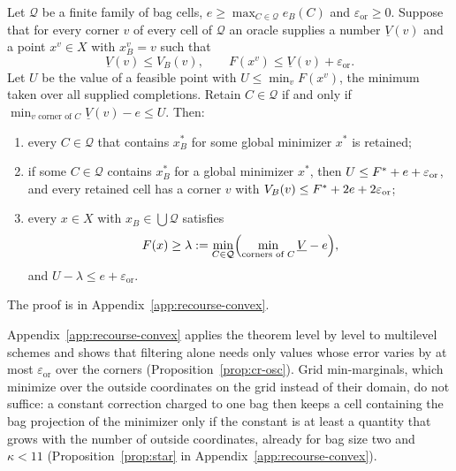 \begin{theorem}\label{thm:cr-filter}
Let $\mathcal Q$ be a finite family of bag cells,
$e\ge\max_{C\in\mathcal Q}e_B(C)$ and $\varepsilon_{\mathrm{or}}\ge0$. Suppose that for every
corner $v$ of every cell of $\mathcal Q$ an oracle supplies a number
$\underline V(v)$ and a point $x^v\in X$ with $x^v_B=v$ such that
\begin{equation}\label{eq:cr-oracle}
\underline V(v)\le V_B(v),\qquad F(x^v)\le\underline V(v)+\varepsilon_{\mathrm{or}} .
\end{equation}
Let $U$ be the value of a feasible point with $U\le\min_vF(x^v)$, the
minimum taken over all supplied completions. Retain $C\in\mathcal Q$ if and
only if $\min_{v\text{ corner of }C}\underline V(v)-e\le U$. Then:
\begin{enumerate}
\item[(a)] every $C\in\mathcal Q$ that contains $x^*_B$ for some global
minimizer $x^*$ is retained;
\item[(b)] if some $C\in\mathcal Q$ contains $x^*_B$ for a global minimizer
$x^*$, then $U\le F^{*}+e+\varepsilon_{\mathrm{or}}$, and every retained cell has a corner $v$
with $V_B(v)\le F^{*}+2e+2\varepsilon_{\mathrm{or}}$;
\item[(c)] every $x\in X$ with $x_B\in\bigcup\mathcal Q$ satisfies
\[
F(x)\ge\lambda:=\min_{C\in\mathcal Q}\Bigl(\min_{\text{corners of }C}\underline V-e\Bigr),
\]
and $U-\lambda\le e+\varepsilon_{\mathrm{or}}$.
\end{enumerate}
\end{theorem}

The proof is in Appendix~\ref{app:recourse-convex}.

Appendix~\ref{app:recourse-convex} applies the theorem level by level to
multilevel schemes and shows that filtering alone needs only values whose
error varies by at most $\varepsilon_{\mathrm{or}}$ over the corners
(Proposition~\ref{prop:cr-osc}). Grid min-marginals, which minimize over
the outside coordinates on the grid instead of their domain, do not suffice:
a constant correction charged to one bag then keeps a cell containing the bag
projection of the minimizer only if the constant is at least a quantity that
grows with the number of outside coordinates, already for bag size two and
$\kappa<11$
(Proposition~\ref{prop:star} in Appendix~\ref{app:recourse-convex}).

